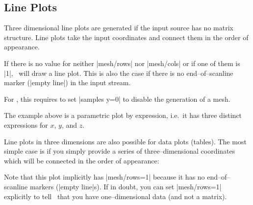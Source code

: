 {\subsection{Line Plots}
\label{sec:pgfplots:lineplots}

Three dimensional line plots are generated if the input source has no matrix structure. Line plots take the input coordinates and connect them in the order of appearance.

\begin{codeexample}[]
\end{codeexample}
If there is no value for neither |mesh/rows| nor |mesh/cols| or if one of them is |1|, \PGFPlots\ will draw a line plot. This is also the case if there is no end--of--scanline marker (|empty line|) in the input stream.

For , this requires to set |samples y=0| to disable the generation of a mesh.
\begin{codeexample}[]
\end{codeexample}
\noindent The example above is a parametric plot by expression, i.e.\ it has three distinct expressions for $x$, $y$, and $z$.

Line plots in three dimensions are also possible for data plots (tables). The most simple case is if you simply provide a series of three--dimensional coordinates which will be connected in the order of appearance:
\begin{codeexample}[]
\end{codeexample}
\noindent Note that this plot implicitly has |mesh/rows=1| because it has no end--of--scanline markers (|empty line|s). If in doubt, you can set |mesh/rows=1| explicitly to tell \PGFPlots\ that you have one--dimensional data (and not a matrix).

}
